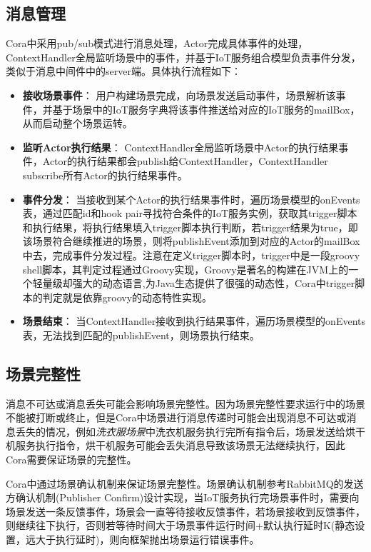 \documentclass[winfonts,master,twoside]{njuthesis}
\begin{document}
\subsection{消息管理}
Cora中采用pub/sub模式进行消息处理，Actor完成具体事件的处理，ContextHandler全局监听场景中的事件，并基于IoT服务组合模型负责事件分发，类似于消息中间件中的server端。具体执行流程如下：
\begin{itemize}
    \item \textbf{接收场景事件}：
    用户构建场景完成，向场景发送启动事件，场景解析该事件，并基于场景中的IoT服务字典将该事件推送给对应的IoT服务的mailBox，从而启动整个场景运转。
    \item \textbf{监听Actor执行结果}：
    ContextHandler全局监听场景中Actor的执行结果事件，Actor的执行结果都会publish给ContextHandler，ContextHandler subscribe所有Actor的执行结果事件。
    \item \textbf{事件分发}：
    当接收到某个Actor的执行结果事件时，遍历场景模型的onEvents表，通过匹配id和hook pair寻找符合条件的IoT服务实例，获取其trigger脚本和执行结果，将执行结果填入trigger脚本执行判断，若trigger结果为true，即该场景符合继续推进的场景，则将publishEvent添加到对应的Actor的mailBox中去，完成事件分发过程。注意在定义trigger脚本时，trigger中是一段groovy shell脚本，其判定过程通过Groovy\cite{groovy}实现，Groovy是著名的构建在JVM上的一个轻量级却强大的动态语言,为Java生态提供了很强的动态性，Cora中trigger脚本的判定就是依靠groovy的动态特性实现。
    \item \textbf{场景结束}：
    当ContextHandler接收到执行结果事件，遍历场景模型的onEvents表，无法找到匹配的publishEvent，则场景执行结束。
\end{itemize}

\subsection{场景完整性}
消息不可达或消息丢失可能会影响场景完整性。因为场景完整性要求运行中的场景不能被打断或终止，但是Cora中场景进行消息传递时可能会出现消息不可达或消息丢失的情况，例如\textit{洗衣服场景}中洗衣机服务执行完所有指令后，场景发送给烘干机服务执行指令，烘干机服务可能会丢失消息导致该场景无法继续执行，因此Cora需要保证场景的完整性。

Cora中通过场景确认机制来保证场景完整性。场景确认机制参考RabbitMQ的发送方确认机制(Publisher Confirm)设计实现，当IoT服务执行完场景事件时，需要向场景发送一条反馈事件，场景会一直等待接收反馈事件，若场景接收到反馈事件，则继续往下执行，否则若等待时间大于场景事件运行时间+默认执行延时K(静态设置，远大于执行延时)，则向框架抛出场景运行错误事件。
\end{document}
